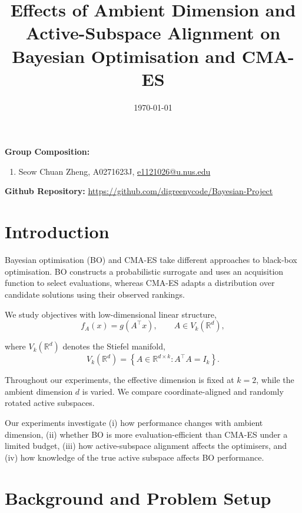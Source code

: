 \documentclass[10pt]{article}
\begin{document}
\title{Effects of Ambient Dimension and Active-Subspace Alignment on Bayesian Optimisation and CMA-ES }
\date{\today}
\maketitle

{\bf Group Composition:}
\begin{enumerate}
\item Seow Chuan Zheng, A0271623J, \href{mailto:e1121026@u.nus.edu}{e1121026@u.nus.edu}
\end{enumerate}

{\bf Github Repository:} \url{https://github.com/digreenycode/Bayesian-Project}


\section{Introduction}

Bayesian optimisation (BO) and CMA-ES take different approaches to black-box optimisation. BO constructs a probabilistic surrogate and uses an acquisition function to select evaluations, whereas CMA-ES adapts a distribution over candidate solutions using their observed rankings.

We study objectives with low-dimensional linear structure,
\begin{equation}
    f_A(x)=g(A^\top x),
    \qquad
    A\in V_k(\mathbb{R}^d),
\end{equation}

where $V_k(\mathbb{R}^d)$ denotes the Stiefel manifold,
\[
    V_k(\mathbb{R}^d)
    =
    \left\{
        A\in\mathbb{R}^{d\times k}
        :
        A^\top A=I_k
    \right\}.
\]

Throughout our experiments, the effective dimension is fixed at $k=2$, while the ambient dimension $d$ is varied. We compare coordinate-aligned and randomly rotated active subspaces.

Our experiments investigate (i) how performance changes with ambient dimension, (ii) whether BO is more evaluation-efficient than CMA-ES under a limited budget, (iii) how active-subspace alignment affects the optimisers, and (iv) how knowledge of the true active subspace affects BO performance.


\section{Background and Problem Setup}
\end{document}
